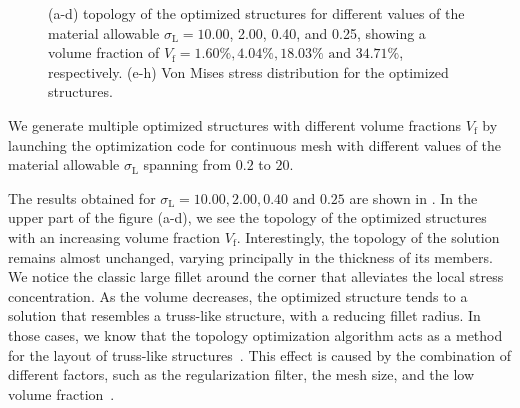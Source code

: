\begin{figure}
    \hfill
    \hfill
    \hfill
    \caption{(a-d) topology of the optimized structures for different values of the material allowable $\sigma_\text{L}=10.00$, 2.00, 0.40, and 0.25, showing a volume fraction of $V_\text{f}=1.60\%,4.04\%,18.03\%\text{ and }34.71\%$, respectively. (e-h) Von Mises stress distribution for the optimized structures.}
    \label{fig:03_to_sol}
\end{figure}
We generate multiple optimized structures with different volume fractions $V_\text{f}$ by launching the optimization code for continuous mesh with different values of the material allowable $\sigma_\text{L}$ spanning from $0.2$ to $20$.

The results obtained for $\sigma_\text{L}=10.00,2.00,0.40\text{ and }0.25$ are shown in . In the upper part of the figure (a-d), we see the topology of the optimized structures with an increasing volume fraction $V_\text{f}$. Interestingly, the topology of the solution remains almost unchanged, varying principally in the thickness of its members. We notice the classic large fillet around the corner that alleviates the local stress concentration. As the volume decreases, the optimized structure tends to a solution that resembles a truss-like structure, with a reducing fillet radius. In those cases, we know that the topology optimization algorithm acts as a method for the layout of truss-like structures~. This effect is caused by the combination of different factors, such as the regularization filter, the mesh size, and the low volume fraction~. 

